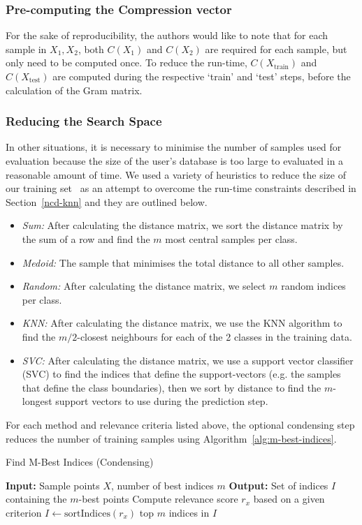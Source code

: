 \documentclass[conference]{IEEEtran}
\begin{document}
\subsubsection{Pre-computing the Compression vector}
For the sake of reproducibility, the authors would like to note that for each sample in $X_1, X_2$, both $C(X_1)$ and $C(X_2)$ are required for each sample, but only need to be computed once. To reduce the run-time, $C(X_{\text{train}})$ and $C(X_{\text{test}})$ are computed during the respective `train' and `test' steps, before the calculation of the Gram matrix.




\subsubsection{Reducing the Search Space}
\label{condensing_methods}
In other situations, it is necessary to minimise the number of samples used for evaluation because the size of the user's database is too large to evaluated in a reasonable amount of time. We used a variety of heuristics to reduce the size of our training set~\cite{amal2011survey} as an attempt to overcome the run-time constraints described in Section~\ref{ncd-knn} and they are outlined below.
\begin{itemize}
    \item \textit{Sum:} After calculating the distance matrix, we sort the distance matrix by the sum of a row and find the $m$ most central samples per class.
    \item \textit{Medoid:} The sample that minimises the total distance to all other samples.
    \item \textit{Random:} After calculating the distance matrix, we select $m$ random indices per class.
    \item \textit{KNN:} After calculating the distance matrix, we use the KNN algorithm to find the $m/2$-closest neighbours for each of the 2 classes in the training data.
    \item \textit{SVC:} After calculating the distance matrix, we use a support vector classifier (SVC) to find the indices that define the support-vectors (e.g. the samples that define the class boundaries), then we sort by distance to find the $m$-longest support vectors to use during the prediction step.
\end{itemize}
For each method and relevance criteria listed above, the optional condensing step reduces the number of training samples using Algorithm~\ref{alg:m-best-indices}.
\begin{algorithm}
  \caption{Find M-Best Indices (Condensing)}
  \label{alg:m-best-indices}
  \begin{algorithmic}
    \State \textbf{Input:} Sample points $X$, number of best indices $m$
    \State \textbf{Output:} Set of indices $I$ containing the $m$-best points
      \State Compute relevance score $r_x$ based on a given criterion
    \EndFor
    \State $I \gets \text{sortIndices}(r_x)$
    \State \Return top $m$ indices in $I$
  \end{algorithmic}
\end{algorithm}
\end{document}
